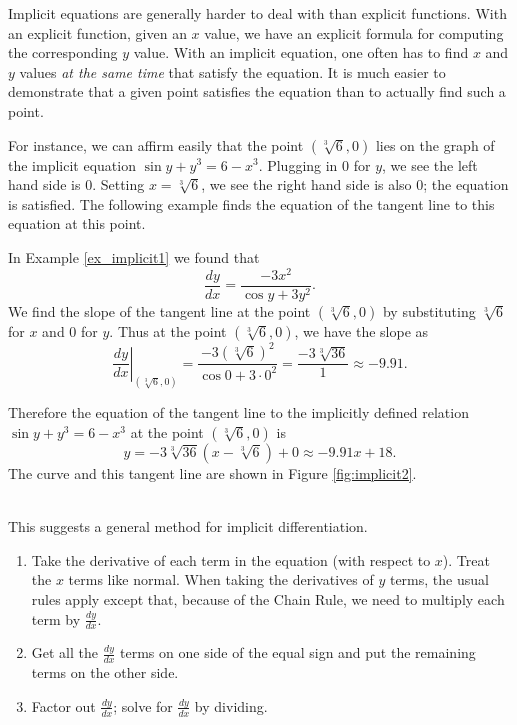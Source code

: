 Implicit equations are generally harder to deal with than explicit functions. With an explicit function, given an $x$ value, we have an explicit formula for computing the corresponding $y$ value. With an implicit equation, one often has to find $x$ and $y$ values \textit{at the same time} that satisfy the equation. It is much easier to demonstrate that a given point satisfies the equation than to actually find such a point.

For instance, we can affirm easily that the point $(\sqrt[3]{6},0)$ lies on the graph of the implicit equation $\sin y + y^3=6-x^3$. Plugging in $0$ for $y$, we see the left hand side is $0$. Setting $x=\sqrt[3]6$, we see the right hand side is also $0$; the equation is satisfied. The following example finds the equation of the tangent line to this equation at this point.\\

{In Example \ref{ex_implicit1} we found that $$\frac{dy}{dx} = \frac{-3x^2}{\cos y +3y^2}.$$ We find the slope of the tangent line at the point  $(\sqrt[3]6,0)$ by substituting $\sqrt[3]6$ for $x$ and $0$ for $y$. Thus at the point $(\sqrt[3]6,0)$, we have the slope as $$\left.\frac{dy}{dx}\right|_{(\sqrt[3]6,0)} = \frac{-3(\sqrt[3]{6})^2}{\cos 0 + 3\cdot0^2} = \frac{-3\sqrt[3]{36}}{1} \approx -9.91.$$

Therefore the equation of the tangent line to the implicitly defined relation $\sin y + y^3=6-x^3$ at the point $(\sqrt[3]{6},0)$ is $$y = -3\sqrt[3]{36}(x-\sqrt[3]{6})+0 \approx -9.91x+18.$$ The curve and this tangent line are shown in Figure \ref{fig:implicit2}.
}\\


This suggests a general method for implicit differentiation.  %
\begin{enumerate}
\item Take the derivative of each term in the equation (with respect to $x$).  Treat the $x$ terms like normal.  When taking the derivatives of $y$ terms, the usual rules apply except that, because of the Chain Rule, we need to multiply each term by $\frac{dy}{dx}$.
\item Get all the $\frac{dy}{dx}$ terms on one side of the equal sign and put the remaining terms on the other side.
\item Factor out $\frac{dy}{dx}$;  solve for $\frac{dy}{dx}$ by dividing.
\end{enumerate}

